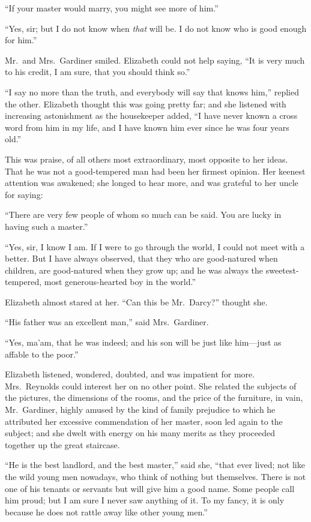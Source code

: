 ``If your master would marry, you might see more of him.''

``Yes, sir; but I do not know when \emph{that} will be.  I do not
know who is good enough for him.''

Mr.\ and Mrs.\ Gardiner smiled.  Elizabeth could not help saying,
``It is very much to his credit, I am sure, that you should think
so.''

``I say no more than the truth, and everybody will say that
knows him,'' replied the other.  Elizabeth thought this was
going pretty far; and she listened with increasing astonishment
as the housekeeper added, ``I have never known a cross word
from him in my life, and I have known him ever since he was
four years old.''

This was praise, of all others most extraordinary, most opposite
to her ideas.  That he was not a good-tempered man had been
her firmest opinion.  Her keenest attention was awakened; she
longed to hear more, and was grateful to her uncle for saying:

``There are very few people of whom so much can be said.  You
are lucky in having such a master.''

``Yes, sir, I know I am.  If I were to go through the world, I
could not meet with a better.  But I have always observed, that
they who are good-natured when children, are good-natured
when they grow up; and he was always the sweetest-tempered,
most generous-hearted boy in the world.''

Elizabeth almost stared at her.  ``Can this be Mr.\ Darcy?''
thought she.

``His father was an excellent man,'' said Mrs.\ Gardiner.

``Yes, ma'am, that he was indeed; and his son will be just like
him---just as affable to the poor.''

Elizabeth listened, wondered, doubted, and was impatient for
more.  Mrs.\ Reynolds could interest her on no other point.  She
related the subjects of the pictures, the dimensions of the rooms,
and the price of the furniture, in vain, Mr.\ Gardiner, highly
amused by the kind of family prejudice to which he attributed
her excessive commendation of her master, soon led again to
the subject; and she dwelt with energy on his many merits as
they proceeded together up the great staircase.

``He is the best landlord, and the best master,'' said she, ``that
ever lived; not like the wild young men nowadays, who think of
nothing but themselves.  There is not one of his tenants or
servants but will give him a good name.  Some people call him
proud; but I am sure I never saw anything of it.  To my fancy, it
is only because he does not rattle away like other young men.''

